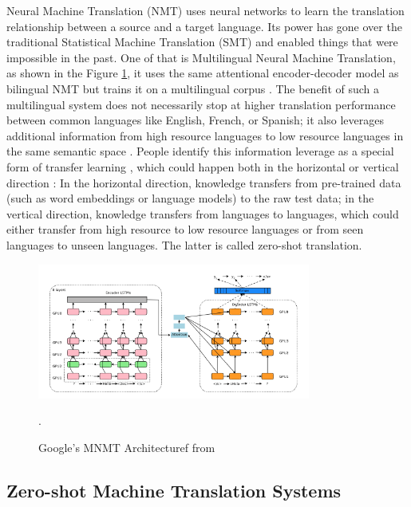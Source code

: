 \documentclass[thesis,fonts=libertine]{cluu}
\begin{document}
Neural Machine Translation (NMT) uses neural networks to learn the translation relationship between a source and a target language. Its power has gone over the traditional Statistical Machine Translation (SMT) and enabled things that were impossible in the past. One of that is Multilingual Neural Machine Translation, as shown in the Figure \ref{fig:google_mnmt}, it uses the same attentional encoder-decoder model as bilingual NMT but trains it on a multilingual corpus \parencite{Johnson:2016aa}. The benefit of such a multilingual system does not necessarily stop at higher translation performance between common languages like English, French, or Spanish; it also leverages additional information from high resource languages to low resource languages in the same semantic space \parencite{Ha:2016aa}. People identify this information leverage as a special form of transfer learning \parencite{Zoph:2016aa}, which could happen both in the horizontal or vertical direction \parencite{Lakew:2019aa}: In the horizontal direction, knowledge transfers from pre-trained data (such as word embeddings or language models) to the raw test data; in the vertical direction, knowledge transfers from languages to languages, which could either transfer from high resource to low resource languages or from seen languages to unseen languages. The latter is called zero-shot translation.

\begin{figure}
  \label{fig:google_mnmt}
  \centering
  \includegraphics[width=0.8\textwidth]{google_mnmt_architecture.png}
  \caption{Google's MNMT Architecturef from \parencite{Johnson:2016aa}}. 
\end{figure}

\subsection{Zero-shot Machine Translation Systems}
\label{sec:zero_shot_mt}
\end{document}
